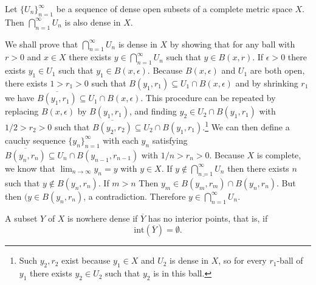 \documentclass[nobib,notoc]{tufte-handout}
\begin{document}
\begin{thm}
	Let \(\{U_n\}_{n=1}^{\infty}\) be a sequence of dense open subsets of a complete metric space \(X\). Then \(\bigcap_{n=1}^{\infty}U_n\) is also dense in \(X\).
	\begin{IEEEproof}
		We shall prove that \(\bigcap_{n=1}^{\infty}U_n\) is dense in \(X\) by showing that for any ball with \(r>0\) and \(x\in X\)  there exists \(y\in\bigcap_{n=1}^{\infty}U_n\) such that \(y\in B(x,r)\).\bigbreak
		If \(\epsilon>0\) there exists \(y_1\in U_1\) such that \(y_1\in B(x,\epsilon)\). Because \(B(x,\epsilon)\) and \(U_1\) are both open, there exists \(1>r_1>0\) such that \(B(y_1,r_1)\subseteq U_1\cap B(x,\epsilon)\) and by shrinking \(r_1\) we have \(\overline{B(y_1,r_1)}\subseteq U_1\cap B(x,\epsilon)\). This procedure can be repeated by replacing \(B(x,\epsilon)\) by \(B(y_1,r_1)\), and finding \(y_2\in U_2\cap B(y_1,r_1)\) with \(1/2>r_2>0\) such that \(\overline{B(y_2,r_2)}\subseteq U_2\cap B(y_1,r_1)\).\footnote{Such \(y_2,r_2\) exist because \(y_1\in X\) and \(U_2\) is dense in \(X\), so for every \(r_1\)-ball of \(y_1\) there exists \(y_2\in U_2\) such that \(y_2\) is in this ball.}
		We can then define a cauchy sequence \(\{y_n\}_{n=1}^{\infty}\) with each \(y_n\) satisfying \(\overline{B(y_n,r_n)}\subseteq U_{n}\cap B(y_{n-1}, r_{n-1})\) with \(1/n>r_n>0\). Because \(X\) is complete, we know that \(\lim_{n\rightarrow\infty}y_n=y\) with \(y\in X\). If \(y\notin\bigcap_{n=1}^{\infty}U_n\) then there exists \(n\) such that \(y\notin B(y_n,r_n)\). If \(m>n\) Then \(y_m\in \overline{B(y_m,r_m)}\cap B(y_n,r_n)\). But then \((y\in B(y_n,r_n)\), a contradiction. Therefore \(y\in\bigcap_{n=1}^{\infty}U_n\).
	\end{IEEEproof}
\end{thm}
\begin{defi}
	A subset \(Y\) of \(X\) is nowhere dense if \(\overline{Y}\) has no interior points, that is, if
	\begin{equation*}
		\text{int}(\overline{Y})=\emptyset.
	\end{equation*}
\end{defi}
\end{document}
